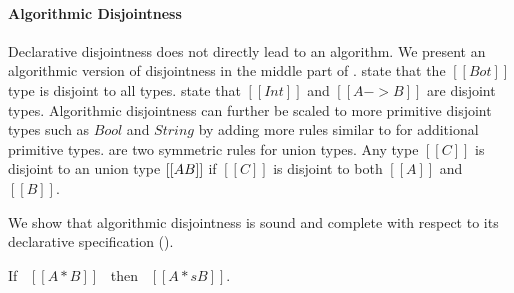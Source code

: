 \begin{comment}
\begin{figure}[t]
  \begin{small}
    \centering
    \drules[ad]{$[[A * B]]$}{Algorithmic Disjointness}{btmr, btml, intl, intr, orl, orr}
  \end{small}
  \caption{Algorithmic disjointness for \cal.}
  \label{fig:union:ad}
\end{figure}
\end{comment}

\paragraph{Algorithmic Disjointness}
Declarative disjointness does not directly lead to an algorithm.
We present an algorithmic version of disjointness in
the middle part of .
 state that the $[[Bot]]$
type is disjoint to all types.   state that
$[[Int]]$ and $[[A -> B]]$ are disjoint types.  Algorithmic
disjointness can further be scaled to more primitive disjoint types
such as $Bool$ and $String$ by adding more rules similar to
 for additional primitive types.
 are two symmetric rules for union types. Any type $[[C]]$ is
disjoint to an union type $[[A \/ B]]$ if $[[C]]$ is disjoint to both
$[[A]]$ and $[[B]]$.

We show that algorithmic disjointness is sound and complete
with respect to its declarative specification ().

\begin{lemma}
  If \ $[[A * B]]$ \ then \ $[[A *s B]]$.
\label{lemma:union:disj-sound}
\end{lemma}

\begin{comment}
\begin{proof}
  By induction on algorithmic disjointness relation.
  \begin{itemize}
    \item Cases \rref{ad-btmr, ad-btml, ad-orl, ad-orr} require induction on hypothesis
          and \Cref{lemma:union:sub-or}.
    \item Cases \rref{ad-intl, ad-intr} require induction on type and \Cref{lemma:union:sub-or}.
  \end{itemize}
\end{proof}
\end{comment}

